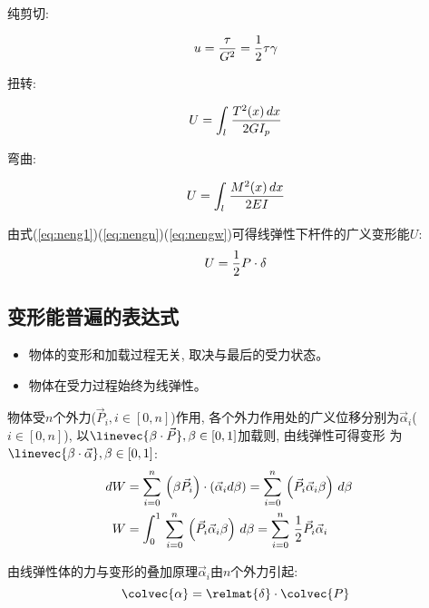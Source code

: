 {\desc 纯剪切}:

\begin{equation}
    \label{eq:nengu}
    u = {\tau\over G^2} = {1\over 2}\tau\gamma
\end{equation}

{\desc 扭转}:

\begin{equation}
    \label{eq:nengn}
    U = \int_l\,{T^2(x)\,dx\over2GI_p}
\end{equation}

{\desc 弯曲}:

\begin{equation}
    \label{eq:nengw}
    U = \int_l\,{M^2(x)\,dx\over2EI}
\end{equation}

由式(\ref{eq:neng1})(\ref{eq:nengn})(\ref{eq:nengw})可得线弹性下杆件的广义变形能$U$:
\begin{equation}
    \label{eq:enngg}
    U = {1\over 2}P\cdot\delta
\end{equation}

\subsection{变形能普遍的表达式}

\begin{itemize}
    \item 物体的变形和加载过程无关, 取决与{\imp 最后的受力状态}。
    \item 物体在受力过程始终为{\imp 线弹性}。
\end{itemize}

\indent 物体受$n$个外力(${\vec P_i}, i\in[0, n]$)作用, 各个外力作用处的广义位移分别为${\vec\alpha}_i$($i\in[0, n]$),%
以$\linevec{\beta\cdot{\vec P}}, \beta\in[0, 1]$加载则, 由线弹性可得变形%
为$\linevec{\beta\cdot{\vec\alpha}}, \beta\in[0, 1]$:
\begin{align}
    dW & = \sum_{i=0}^n\,{\left(\beta {\vec P_i}\right)\cdot\left({\vec\alpha}_i d\beta\right)} =%
    \sum_{i=0}^n\,{\left({\vec P_i}{\vec\alpha}_i\beta\right)\,d\beta}\label{eq:gyybnd}\cr
    W & = \int_0^1\,{\sum_{i=0}^n\,{\left({\vec P_i}{\vec\alpha}_i\beta\right)\,d\beta}} = %
    \sum_{i=0}^n\,{1\over 2}{\vec P_i} {\vec\alpha}_i
\end{align}

由线弹性体的力与变形的叠加原理${\vec\alpha_i}$由$n$个外力引起:
\begin{equation}
    \label{eq:ldjz}
    \colvec{\alpha} = \relmat{\delta}\cdot\colvec{P}
\end{equation}

